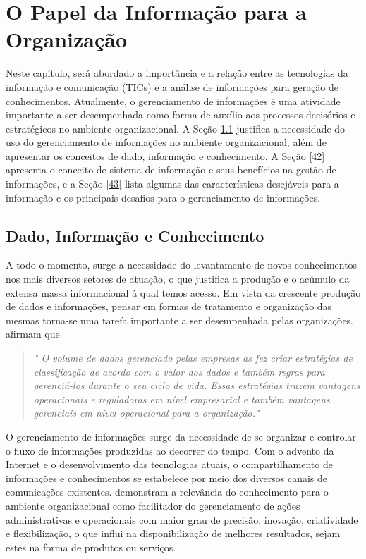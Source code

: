
\chapter{O Papel da Informação para a Organização} \label{chapter4}

Neste capítulo, será abordado a importância e a relação entre as tecnologias da informação e comunicação (TICs) e a análise de informações para geração de conhecimentos. Atualmente, o gerenciamento de informações é uma atividade importante a ser desempenhada como forma de auxílio aos processos decisórios e estratégicos no ambiente organizacional. A Seção \ref{41} justifica a necessidade do uso do gerenciamento de informações no ambiente organizacional, além de apresentar os conceitos de dado, informação e conhecimento. A Seção \ref{42} apresenta o conceito de sistema de informação e seus benefícios na gestão de informações, e a Seção \ref{43} lista algumas das características desejáveis para a informação e os principais desafios para o gerenciamento de informações. 

\section{Dado, Informação e Conhecimento} \label{41}

A todo o momento, surge a necessidade do levantamento de novos conhecimentos nos mais diversos setores de atuação, o que justifica a produção e o acúmulo da extensa massa informacional à qual temos acesso. Em vista da crescente produção de dados e informações, pensar em formas de tratamento e organização das mesmas torna-se uma tarefa importante a ser desempenhada pelas organizações. \citet[p. 25-26]{somasundaram2011} afirmam que 
\begin{quotation}
	\textit{" O volume de dados gerenciado pelas empresas as fez criar estratégias de classificação de acordo com o valor dos dados e também regras para gerenciá-los durante o seu ciclo de vida. Essas estratégias trazem vantagens operacionais e reguladoras em nível empresarial e também vantagens gerenciais em nível operacional para a organização."} 
\end{quotation}
	
O gerenciamento de informações surge da necessidade de se organizar e controlar o fluxo de informações produzidas ao decorrer do tempo. Com o advento da Internet e o desenvolvimento das tecnologias atuais, o compartilhamento de informações e conhecimentos se estabelece por meio dos diversos canais de comunicações existentes. \citet{cardoso_machado2008} demonstram a relevância do conhecimento para o ambiente organizacional como facilitador do gerenciamento de ações administrativas e operacionais com maior grau de precisão, inovação, criatividade e flexibilização, o que influi na disponibilização de melhores resultados, sejam estes na forma de produtos ou serviços. 

